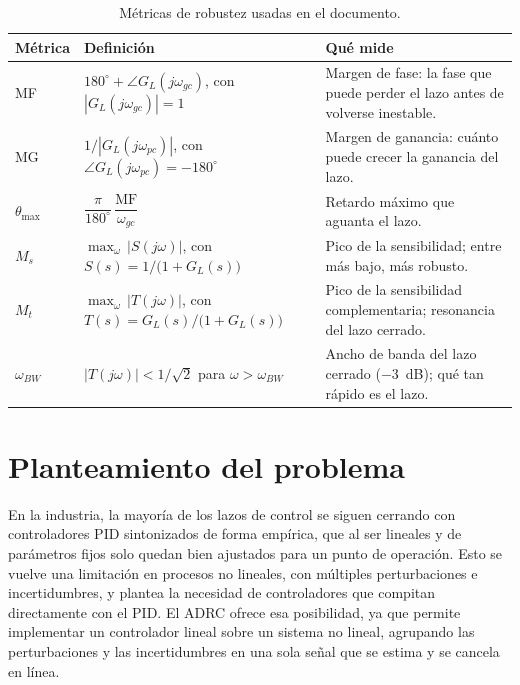 \begin{table}[H]
\centering
\caption{Métricas de robustez usadas en el documento.}
\label{tab:metricas_robustez}
\small
\renewcommand{\arraystretch}{1.05}
\begin{tabular}{@{}l>{\centering\arraybackslash}p{6.0cm}>{\raggedright\arraybackslash}p{7.0cm}@{}}
\toprule
\textbf{Métrica} & \textbf{Definición} & \textbf{Qué mide} \\
\midrule
MF & $180^{\circ} + \angle G_L(j\omega_{gc})$, \newline con $|G_L(j\omega_{gc})| = 1$ & Margen de fase: la fase que puede perder el lazo antes de volverse inestable. \\
MG & $1/|G_L(j\omega_{pc})|$, \newline con $\angle G_L(j\omega_{pc}) = -180^{\circ}$ & Margen de ganancia: cuánto puede crecer la ganancia del lazo. \\
$\theta_{\max}$ & $\dfrac{\pi}{180^{\circ}}\,\dfrac{\mathrm{MF}}{\omega_{gc}}$ & Retardo máximo que aguanta el lazo. \\
$M_s$ & $\max_{\omega}\,|S(j\omega)|$, \newline con $S(s) = 1/\bigl(1 + G_L(s)\bigr)$ & Pico de la sensibilidad; entre más bajo, más robusto. \\
$M_t$ & $\max_{\omega}\,|T(j\omega)|$, \newline con $T(s) = G_L(s)/\bigl(1 + G_L(s)\bigr)$ & Pico de la sensibilidad complementaria; resonancia del lazo cerrado. \\
$\omega_{BW}$ & $|T(j\omega)| < 1/\sqrt{2}$ para $\omega > \omega_{BW}$ & Ancho de banda del lazo cerrado ($-3$~dB); qué tan rápido es el lazo. \\
\bottomrule
\end{tabular}
\end{table}

\section{Planteamiento del problema}
\label{sec:problema}

En la industria, la mayoría de los lazos de control se siguen cerrando con
controladores PID sintonizados de forma empírica, que al ser lineales y de
parámetros fijos solo quedan bien ajustados para un punto de operación. Esto
se vuelve una limitación en procesos no lineales, con múltiples perturbaciones
e incertidumbres, y plantea la necesidad de controladores que compitan
directamente con el PID. El ADRC ofrece esa posibilidad, ya que permite implementar
un controlador lineal sobre un sistema no lineal, agrupando las perturbaciones
y las incertidumbres en una sola señal que se estima y se cancela en línea.

